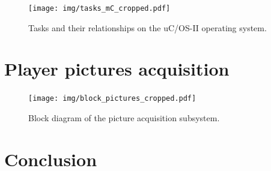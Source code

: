 \documentclass[english, DIV=13]{scrreprt}
\begin{document}
\begin{figure}
    \centering
    \texttt{[image: img/tasks\_mC\_cropped.pdf]}
    \caption{Tasks and their relationships on the uC/OS-II operating system.}
\end{figure}

\chapter{Player pictures acquisition}

\begin{figure}
    \centering
    \texttt{[image: img/block\_pictures\_cropped.pdf]}
    \caption{Block diagram of the picture acquisition subsystem.}
\end{figure}

\chapter{Conclusion}
\end{document}
